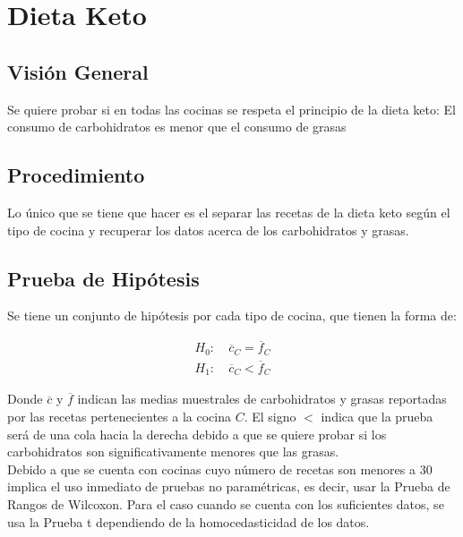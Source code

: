 \documentclass[12pt,a4paper]{article}
\begin{document}
    \section{Dieta Keto}
    {
        \subsection{Visión General}
        {
            Se quiere probar si en todas las cocinas se respeta el principio 
            de la dieta keto: El consumo de carbohidratos es menor que el 
            consumo de grasas
        }

        \subsection{Procedimiento}
        {
            Lo único que se tiene que hacer es el separar las recetas de la 
            dieta keto según el tipo de cocina y recuperar los datos acerca 
            de los carbohidratos y grasas.
        }

        \subsection{Prueba de Hipótesis}
        {
            Se tiene un conjunto de hipótesis por cada tipo de cocina, que 
            tienen la forma de:
            
            \begin{align*}
                H_0 :&\ \overline{c}_{C} = \overline{f}_{C} \\ 
                H_1 :&\ \overline{c}_{C} < \overline{f}_{C}
            \end{align*}

            Donde $\overline{c}$ y $\overline{f}$ indican las medias muestrales de carbohidratos y grasas
            reportadas por las recetas pertenecientes a la cocina $C$. El signo 
            $<$ indica que la prueba será de una cola hacia la derecha debido a 
            que se quiere probar si los carbohidratos son significativamente menores 
            que las grasas.\\

            Debido a que se cuenta con cocinas cuyo número de recetas son menores a 
            $30$ implica el uso inmediato de pruebas no paramétricas, es decir, usar 
            la Prueba de Rangos de Wilcoxon. Para el caso cuando se cuenta con los 
            suficientes datos, se usa la Prueba t dependiendo de la homocedasticidad  
            de los datos.
        }
    }
\end{document}
